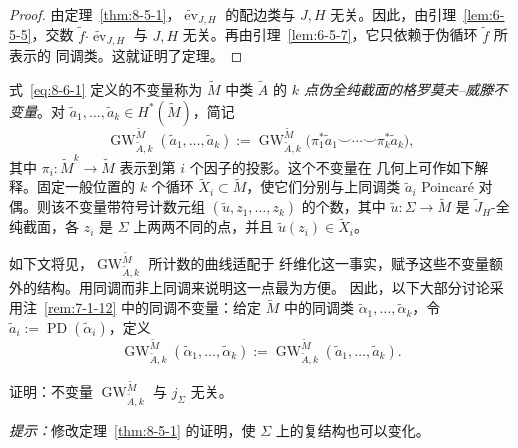 \begin{proof}
由定理~\ref{thm:8-5-1}，$\widetilde{\operatorname{ev}}_{J,H}$ 的配边类与 $J,H$
无关。因此，由引理~\ref{lem:6-5-5}，交数
$\widetilde f\mathbin{\boldsymbol\cdot}\widetilde{\operatorname{ev}}_{J,H}$ 与
$J,H$ 无关。再由引理~\ref{lem:6-5-7}，它只依赖于伪循环 $\widetilde f$ 所表示的
同调类。这就证明了定理。
\end{proof}

式~\eqref{eq:8-6-1} 定义的不变量称为 $\widetilde M$ 中类 $\widetilde A$ 的
\emph{$k$ 点伪全纯截面的格罗莫夫--威滕不变量}。对
$\widetilde a_1,\ldots,\widetilde a_k\in H^*(\widetilde M)$，简记
\[
  \operatorname{GW}^{\widetilde M}_{\widetilde A,k}
  (\widetilde a_1,\ldots,\widetilde a_k)
  :=\operatorname{GW}^{\widetilde M}_{\widetilde A,k}
  \bigl(\pi_1^*\widetilde a_1\smile\cdots\smile
  \pi_k^*\widetilde a_k\bigr),
\]
其中 $\pi_i:\widetilde M^k\to\widetilde M$ 表示到第 $i$ 个因子的投影。这个不变量在
几何上可作如下解释。固定一般位置的 $k$ 个循环
$\widetilde X_i\subset\widetilde M$，使它们分别与上同调类 $\widetilde a_i$ Poincaré
对偶。则该不变量带符号计数元组
$(\widetilde u,z_1,\ldots,z_k)$ 的个数，其中
$\widetilde u:\Sigma\to\widetilde M$ 是 $\widetilde J_H$-全纯截面，各 $z_i$ 是
$\Sigma$ 上两两不同的点，并且 $\widetilde u(z_i)\in\widetilde X_i$。

如下文将见，$\operatorname{GW}^{\widetilde M}_{\widetilde A,k}$ 所计数的曲线适配于
纤维化这一事实，赋予这些不变量额外的结构。用同调而非上同调来说明这一点最为方便。
因此，以下大部分讨论采用注~\ref{rem:7-1-12} 中的同调不变量：给定
$\widetilde M$ 中的同调类
$\widetilde\alpha_1,\ldots,\widetilde\alpha_k$，令
$\widetilde a_i:=\operatorname{PD}(\widetilde\alpha_i)$，定义
\[
  \operatorname{GW}^{\widetilde M}_{\widetilde A,k}
  (\widetilde\alpha_1,\ldots,\widetilde\alpha_k)
  :=\operatorname{GW}^{\widetilde M}_{\widetilde A,k}
  (\widetilde a_1,\ldots,\widetilde a_k).
\]

\begin{exercise}\label{ex:8-6-2}
证明：不变量 $\operatorname{GW}^{\widetilde M}_{\widetilde A,k}$ 与 $j_\Sigma$ 无关。

\emph{提示：}修改定理~\ref{thm:8-5-1} 的证明，使 $\Sigma$ 上的复结构也可以变化。
\end{exercise}


